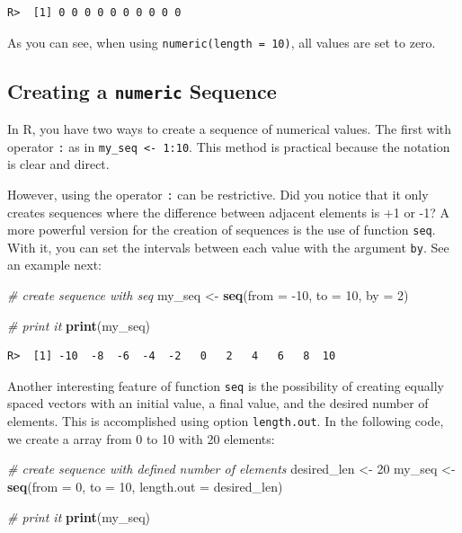 \documentclass[
  12pt,
]{book}
\newenvironment{Shaded}{\begin{snugshade}}{\end{snugshade}}
\newcommand{\CommentTok}[1]{\textcolor[rgb]{0.37,0.37,0.37}{\textit{#1}}}
\newcommand{\DataTypeTok}[1]{\textcolor[rgb]{0.27,0.27,0.27}{#1}}
\newcommand{\DecValTok}[1]{\textcolor[rgb]{0.06,0.06,0.06}{#1}}
\newcommand{\KeywordTok}[1]{\textcolor[rgb]{0.27,0.27,0.27}{\textbf{#1}}}
\newcommand{\NormalTok}[1]{#1}
\newcommand{\StringTok}[1]{\textcolor[rgb]{0.5,0.5,0.5}{#1}}
\begin{document}
\begin{verbatim}
R>  [1] 0 0 0 0 0 0 0 0 0 0
\end{verbatim}

As you can see, when using \texttt{numeric(length\ =\ 10)}, all values are set to zero.

\hypertarget{creating-a-numeric-sequence}{%
\subsection{\texorpdfstring{Creating a \texttt{numeric} Sequence}{Creating a numeric Sequence}}\label{creating-a-numeric-sequence}}

In R, you have two ways to create a sequence of numerical values. The first with operator \texttt{:} as in \texttt{my\_seq\ \textless{}-\ 1:10}. This method is practical because the notation is clear and direct.

However, using the operator \texttt{:} can be restrictive. Did you notice that it only creates sequences where the difference between adjacent elements is +1 or -1? A more powerful version for the creation of sequences is the use of function \texttt{seq}. With it, you can set the intervals between each value with the argument \texttt{by}. See an example next: 

\begin{Shaded}
\begin{Highlighting}[]
\CommentTok{# create sequence with seq}
\NormalTok{my_seq <-}\StringTok{ }\KeywordTok{seq}\NormalTok{(}\DataTypeTok{from =} \DecValTok{-10}\NormalTok{, }
              \DataTypeTok{to =} \DecValTok{10}\NormalTok{, }
              \DataTypeTok{by =} \DecValTok{2}\NormalTok{)}

\CommentTok{# print it}
\KeywordTok{print}\NormalTok{(my_seq)}
\end{Highlighting}
\end{Shaded}

\begin{verbatim}
R>  [1] -10  -8  -6  -4  -2   0   2   4   6   8  10
\end{verbatim}

Another interesting feature of function \texttt{seq} is the possibility of creating equally spaced vectors with an initial value, a final value, and the desired number of elements. This is accomplished using option \texttt{length.out}. In the following code, we create a array from 0 to 10 with 20 elements:

\begin{Shaded}
\begin{Highlighting}[]
\CommentTok{# create sequence with defined number of elements}
\NormalTok{desired_len <-}\StringTok{ }\DecValTok{20}
\NormalTok{my_seq <-}\StringTok{ }\KeywordTok{seq}\NormalTok{(}\DataTypeTok{from =} \DecValTok{0}\NormalTok{, }
              \DataTypeTok{to =} \DecValTok{10}\NormalTok{, }
              \DataTypeTok{length.out =}\NormalTok{ desired_len)}

\CommentTok{# print it}
\KeywordTok{print}\NormalTok{(my_seq)}
\end{Highlighting}
\end{Shaded}
\end{document}
